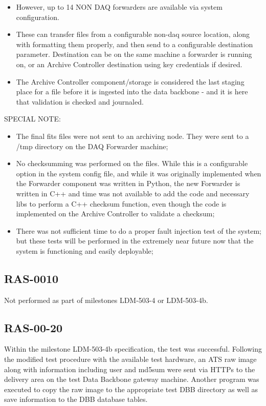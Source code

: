 \documentclass[DM,lsstdraft,STR,toc]{lsstdoc}
\begin{document}
\begin{itemize}
{}
 \item{
However, up to 14 NON DAQ forwarders are available via system configuration. 
}
 \item{
These can transfer files from a configurable non-daq source location, along with formatting them properly, and then send to a configurable destination parameter. Destination can be on the same machine a forwarder is running on, or an Archive Controller destination using key credentials if desired. 
}
 \item{
The Archive Controller component/storage is considered the last staging place for a file before it is ingested into the data backbone - and it is here that validation is checked and journaled.
}
\end{itemize}

SPECIAL NOTE:
\begin{itemize}

  \item{The final fits files were not sent to an archiving node. They were sent to a /tmp directory on the DAQ Forwarder machine; } 
  \item{No checksumming was performed on the files. While this is a configurable option in the system config file, and while it was originally implemented when the Forwarder component was written in Python, the new Forwarder is written in C++ and time was not available to add the code and necessary libs to perform a C++ checksum function, even though the code is implemented on the Archive Controller to validate a checksum; } 
  \item{ There was not sufficient time to do a proper fault injection test of the system; but these tests will be performed in the extremely near future now that the system is functioning and easily deployable;} 
\end{itemize}

\subsection{RAS-0010}
\label{sect:detail-RAS-00-10}
Not performed as part of milestones LDM-503-4 or LDM-503-4b.
\subsection{RAS-00-20}
\label{sect:detail-RAS-00-20}

Within the milestone LDM-503-4b specification, the test was successful.
Following the modified test procedure with the available test
hardware, an ATS raw image along with information including user
and md5sum were sent via HTTPs to the delivery area on the test
Data Backbone gateway machine.   Another program was executed to
copy the raw image to the appropriate test DBB directory as well as
save information to the DBB database tables.
\end{document}
